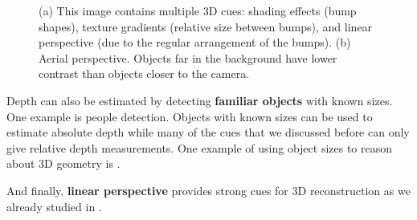 \begin{figure}
\centerline{
}
\caption{(a) This image contains multiple 3D cues: shading effects (bump shapes), texture gradients (relative size between bumps), and linear perspective (due to the regular arrangement of the bumps). (b) Aerial perspective. Objects far in the background have lower contrast than objects closer to the camera.}
\label{fig:aerial_perspective}
\end{figure}

Depth can also be estimated by detecting {\bf familiar objects} with known sizes. One example is people detection. Objects with known sizes can be used to estimate absolute depth while many of the cues that we discussed before can only give relative depth measurements. One example of using object sizes to reason about 3D geometry is \cite{Hoiem2008}.

And finally, {\bf linear perspective} provides strong cues for 3D reconstruction as we already studied in \chap{\ref{chapter:3D_single_view}}. 





